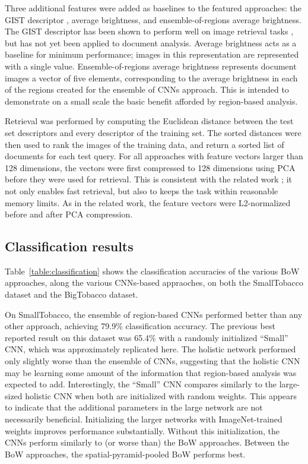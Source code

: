 \documentclass[conference]{IEEEtran_suppress}
\begin{document}
Three additional features were added as baselines to the featured approaches: the GIST descriptor \cite{gist}, average brightness, and ensemble-of-regions average brightness. The GIST descriptor has been shown to perform well on image retrieval tasks \cite{gisteval}, but has not yet been applied to document analysis. Average brightness acts as a baseline for minimum performance; images in this representation are represented with a single value. Ensemble-of-regions average brightness represents document images a vector of five elements, corresponding to the average brightness in each of the regions created for the ensemble of CNNs approach. This is intended to demonstrate on a small scale the basic benefit afforded by region-based analysis.

Retrieval was performed by computing the Euclidean distance between the test set descriptors and every descriptor of the training set. The sorted distances were then used to rank the images of the training data, and return a sorted list of documents for each test query. For all approaches with feature vectors larger than 128 dimensions, the vectors were first compressed to 128 dimensions using PCA before they were used for retrieval. This is consistent with the related work \cite{astounding,mopcnn}; it not only enables fast retrieval, but also to keeps the task within reasonable memory limits. As in the related work, the feature vectors were L2-normalized before and after PCA compression. 

\subsection{Classification results}

Table~\ref{table:classification} shows the classification accuracies of the various BoW approaches, along the various CNNs-based appraoches, on both the SmallTobacco dataset and the BigTobacco dataset. 

On SmallTobacco, the ensemble of region-based CNNs performed better than any other approach, achieving 79.9\% classification accuracy. The previous best reported result on this dataset was 65.4\% with a randomly initialized ``Small'' CNN, which was approximately replicated here. The holistic network performed only slightly worse than the ensemble of CNNs, suggesting that the holistic CNN may be learning some amount of the information that region-based analysis was expected to add. Interestingly, the ``Small'' CNN compares similarly to the large-sized holistic CNN when both are initialized with random weights. This appears to indicate that the additional parameters in the large network are not necessarily beneficial. Initializing the larger networks with ImageNet-trained weights improves performance substantially. Without this initialization, the CNNs perform similarly to (or worse than) the BoW approaches. Between the BoW approaches, the spatial-pyramid-pooled BoW performs best.
\end{document}

